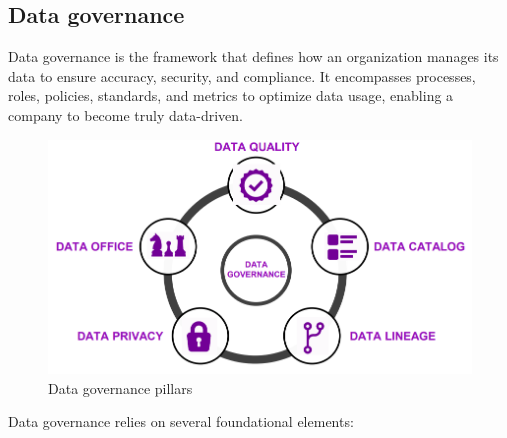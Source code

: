 \subsection{Data governance}
Data governance is the framework that defines how an organization manages its data to ensure accuracy, security, and compliance. 
It encompasses processes, roles, policies, standards, and metrics to optimize data usage, enabling a company to become truly data-driven.
\begin{figure}[H]
    \centering
    \includegraphics[width=0.5\linewidth]{images/bis5.png}
    \caption{Data governance pillars}
\end{figure}
Data governance relies on several foundational elements: 
